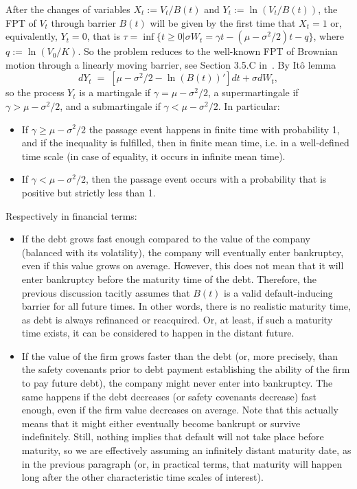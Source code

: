 \documentclass[12pt]{article}
\theoremstyle{definition}
\begin{document}
After the changes of variables $X_t := V_t/B(t)$ and $Y_t := \ln(V_t/B(t))$, the FPT of $V_t$ through barrier $B(t)$ will be given by the first time that $X_t=1$ or, equivalently, $Y_t=0$, that is $\tau=\inf\lbrace t\geq 0\vert\sigma W_t=\gamma t-(\mu-\sigma^2/2)t-q\rbrace$, where $q:=\ln(V_0/K)$. So the problem reduces to the well-known FPT of Brownian motion through a linearly moving barrier, see Section 3.5.C in~\cite{karatzas1991brownian}. By It\^o lemma
$$dY_t\;=\;[\mu -\sigma^2/2 - \ln(B(t))'] dt + \sigma dW_t,$$
so the process $Y_t$ is a martingale if $\gamma =\mu -\sigma^2/2$, a supermartingale if $\gamma >\mu -\sigma^2/2$, and a submartingale if $\gamma<\mu -\sigma^2/2$. In particular:
\begin{itemize}
    \item If $\gamma \ge \mu -\sigma^2/2$ the passage event happens in finite time with probability 1, and if the inequality is fulfilled, then in finite mean time, i.e. in a well-defined time scale (in case of equality, it occurs in infinite mean time).
    \item If $\gamma <\mu -\sigma^2/2$, then the passage event occurs with a probability that is positive but strictly less than 1.
\end{itemize}
Respectively in financial terms:
\begin{itemize}
    \item If the debt grows fast enough compared to the value of the company (balanced with its volatility), the company will eventually enter bankruptcy, even if this value grows on average. However, this does not mean that it will enter bankruptcy before the maturity time of the debt. Therefore, the previous discussion tacitly assumes that $B(t)$ is a valid default-inducing barrier for all future times. In other words, there is no realistic maturity time, as debt is always refinanced or reacquired. Or, at least, if such a maturity time exists, it can be considered to happen in the distant future.
    \item If the value of the firm grows faster than the debt (or, more precisely, than the safety covenants prior to debt payment establishing the ability of the firm to pay future debt), the company might never enter into bankruptcy. The same happens if the debt decreases (or safety covenants decrease) fast enough, even if the firm value decreases on average. Note that this actually means that it might either eventually become bankrupt or survive indefinitely. Still, nothing implies that default will not take place before maturity, so we are effectively assuming an infinitely distant maturity date, as in the previous paragraph (or, in practical terms, that maturity will happen long after the other characteristic time scales of interest).
\end{itemize}
\end{document}
